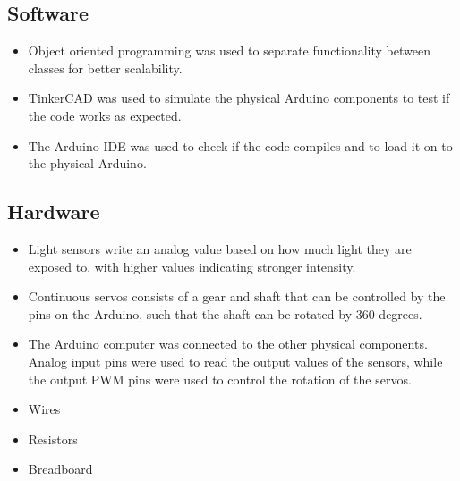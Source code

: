 \documentclass[journal]{IEEEtran}
\begin{document}

\subsection{Software}
\begin{itemize}
    \item{Object oriented programming was used to separate functionality between classes for better scalability.}
    \item{TinkerCAD was used to simulate the physical Arduino components to test if the code works as expected.}
    \item{The Arduino IDE was used to check if the code compiles and to load it on to the physical Arduino.}
\end{itemize}
\subsection{Hardware}
\begin{itemize}
    \item{Light sensors write an analog value based on how much light they are exposed to, with higher values indicating stronger intensity.}
    \item{Continuous servos consists of a gear and shaft that can be controlled by the pins on the Arduino, such that the shaft can be rotated by 360 degrees.}
    \item{The Arduino computer was connected to the other physical components. Analog input pins were used to read the output values of the sensors, while the output PWM pins were used to control the rotation of the servos.}
    \item{Wires}
    \item{Resistors}
    \item{Breadboard}
\end{itemize}


\end{document}

